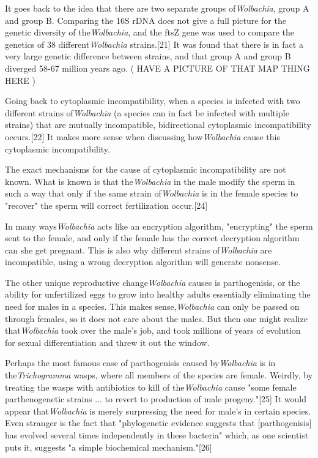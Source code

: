 \documentclass[twocolumn]{article}
\begin{document}
It goes back to the idea that there are two separate groups of\textit{Wolbachia}, group A and group B. Comparing the 16S rDNA does not give a full picture for the genetic diversity of the\textit{Wolbachia}, and the ftsZ gene was used to compare the genetics of 38 different\textit{Wolbachia} strains.[21] It was found that there is in fact a very large genetic difference between strains, and that group A and group B diverged 58-67 million years ago. ( HAVE A PICTURE OF THAT MAP THING HERE )

Going back to cytoplasmic incompatibility, when a species is infected with two different strains of\textit{Wolbachia} (a species can in fact be infected with multiple strains) that are mutually incompatible, bidirectional cytoplasmic incompatibility occurs.[22] It makes more sense when discussing how\textit{Wolbachia} cause this cytoplasmic incompatibility.

The exact mechanisms for the cause of cytoplasmic incompatibility are not known. What is known is that the\textit{Wolbachia} in the male modify the sperm in such a way that only if the same strain of\textit{Wolbachia} is in the female species to "recover" the sperm will correct fertilization occur.[24]

In many ways\textit{Wolbachia} acts like an encryption algorithm, "encrypting" the sperm sent to the female, and only if the female has the correct decryption algorithm can she get pregnant. This is also why different strains of\textit{Wolbachia} are incompatible, using a wrong decryption algorithm will generate nonsense.

The other unique reproductive change\textit{Wolbachia} causes is parthogenisis, or the ability for unfertilized eggs to grow into healthy adults essentially eliminating the need for males in a species. This makes sense,\textit{Wolbachia} can only be passed on through females, so it does not care about the males. But then one might realize that\textit{Wolbachia} took over the male's job, and took millions of years of evolution for sexual differentiation and threw it out the window.

Perhaps the most famous case of parthogenisis caused by\textit{Wolbachia} is in the\textit{Trichogramma} wasps, where all members of the species are female. Weirdly, by treating the wasps with antibiotics to kill of the\textit{Wolbachia} cause "some female parthenogenetic strains ... to revert to production of male progeny."[25] It would appear that\textit{Wolbachia} is merely surpressing the need for male's in certain species. Even stranger is the fact that "phylogenetic evidence suggests that [parthogenisis] has evolved several times independently in these bacteria" which, as one scientist puts it, suggests "a simple biochemical mechanism."[26]  
\end{document}
